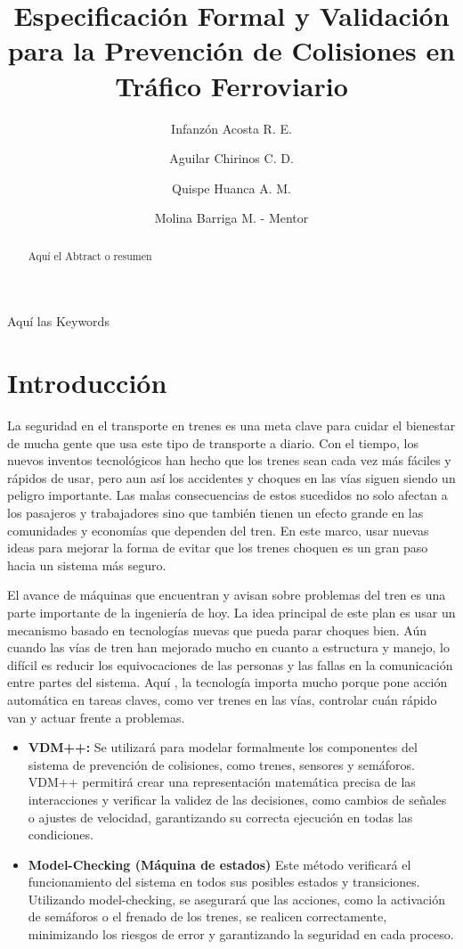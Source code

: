 \documentclass[journal]{IEEEtran}
\title{Especificación Formal y Validación para la Prevención de Colisiones en Tráfico Ferroviario}
\author[1]{Infanzón Acosta R. E.}
\author[1]{Aguilar Chirinos C. D.}
\author[1]{Quispe Huanca A. M.}
\affil{Universidad La Salle, Arequipa, Perú}
\author[2]{Molina Barriga M. - Mentor }
\begin{document}
 

\maketitle

\begin{abstract}
Aquí el Abtract o resumen
\end{abstract}

\begin{IEEEkeywords}
Aquí las Keywords
\end{IEEEkeywords}

\section{Introducción}
La seguridad en el transporte en trenes es una meta clave para cuidar el bienestar de mucha gente que usa este tipo de transporte a diario. Con el tiempo, los nuevos inventos tecnológicos han hecho que los trenes sean cada vez más fáciles y rápidos de usar, pero aun así los accidentes y choques en las vías siguen siendo un peligro importante. Las malas consecuencias de estos sucedidos no solo afectan a los pasajeros y trabajadores sino que también tienen un efecto grande en las comunidades y economías que dependen del tren. En este marco, usar nuevas ideas para mejorar la forma de evitar que los trenes choquen es un gran paso hacia un sistema más seguro.

El avance de máquinas que encuentran y avisan sobre problemas del tren es una parte importante de la ingeniería de hoy. La idea principal de este plan es usar un mecanismo basado en tecnologías nuevas que pueda parar choques bien. Aún cuando las vías de tren han mejorado mucho en cuanto a estructura y manejo, lo difícil es reducir los equivocaciones de las personas y las fallas en la comunicación entre partes del sistema. Aquí , la tecnología importa mucho porque pone acción automática en tareas claves, como ver trenes en las vías, controlar cuán rápido van y actuar frente a problemas.

\begin{itemize}
    \item \textbf{VDM++:} Se utilizará para modelar formalmente los componentes del sistema de prevención de colisiones, como trenes, sensores y semáforos. VDM++ permitirá crear una representación matemática precisa de las interacciones y verificar la validez de las decisiones, como cambios de señales o ajustes de velocidad, garantizando su correcta ejecución en todas las condiciones.
    \item \textbf{Model-Checking (M\'aquina de estados)} Este método verificará el funcionamiento del sistema en todos sus posibles estados y transiciones. Utilizando model-checking, se asegurará que las acciones, como la activación de semáforos o el frenado de los trenes, se realicen correctamente, minimizando los riesgos de error y garantizando la seguridad en cada proceso.
\end{itemize}
\end{document}
